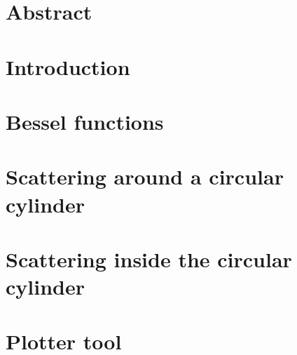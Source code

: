 \documentclass{report}
\begin{document}
    
    

\chapter*{Abstract} 
    

\chapter{Introduction}
    
    

\chapter{Bessel functions}
    

\chapter{Scattering around a circular cylinder}\label{chp:outside}
    

\chapter{Scattering inside the circular cylinder}\label{chp:inside}
  

\chapter{Plotter tool}
    

\printbibliography
{}
\end{document}
